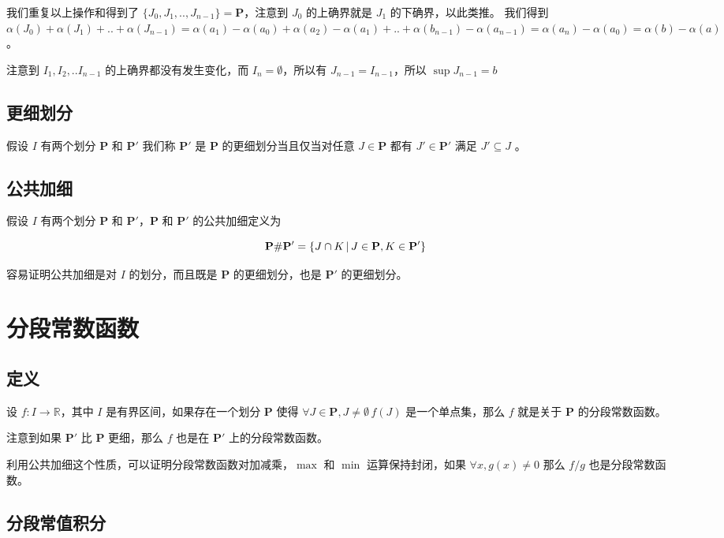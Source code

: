 我们重复以上操作和得到了 $\{ J_0, J_1, .., J_{n-1} \} = \mathbf{P}$，注意到 $J_0$ 的上确界就是 $J_1$ 的下确界，以此类推。
我们得到 $\alpha(J_0) + \alpha( J_1) + .. + \alpha( J_{n-1})  = \alpha(a_1) - \alpha(a_0) + \alpha(a_2) - \alpha(a_1) + .. + \alpha(b_{n-1}) - \alpha(a_{n-1}) = \alpha(a_n) - \alpha(a_0) = \alpha(b) - \alpha(a)$。

注意到 $I_1, I_2, .. I_{n-1}$ 的上确界都没有发生变化，而 $I_n = \emptyset$，所以有 $J_{n-1} = I_{n-1}$，所以 $\sup J_{n-1} = b$

\subsection{更细划分}

假设 $I $ 有两个划分 $\mathbf{P}$ 和 $\mathbf{P'}$ 我们称 $\mathbf{P'}$ 是 $\mathbf{P}$ 的更细划分当且仅当对任意 $J \in \mathbf{P}$ 都有 $J' \in \mathbf{P'}$ 满足 $J' \subseteq J$ 。

\subsection{公共加细}

假设 $I $ 有两个划分 $\mathbf{P}$ 和 $\mathbf{P'}$，$\mathbf{P}$ 和 $\mathbf{P'}$ 的公共加细定义为 

\[
    \mathbf{P} \# \mathbf{P'} = \{ J \cap K \,\vert\, J \in \mathbf{P}, K \in \mathbf{P'}\}
\]

容易证明公共加细是对 $I$ 的划分，而且既是 $ \mathbf{P}$ 的更细划分，也是 $\mathbf{P'}$ 的更细划分。

\section{分段常数函数}

\subsection{定义}
设 $f: I \to \mathbb{R}$，其中 $I$ 是有界区间，如果存在一个划分 $\mathbf{P}$ 使得 $\forall J \in \mathbf{P}, J \ne \emptyset \, f(J)$ 是一个单点集，那么 $f$ 就是关于 $\mathbf{P}$ 的分段常数函数。

注意到如果 $\mathbf{P'}$ 比 $\mathbf{P}$ 更细，那么 $f$ 也是在 $\mathbf{P'}$ 上的分段常数函数。

利用公共加细这个性质，可以证明分段常数函数对加减乘，$\max$ 和 $\min$ 运算保持封闭，如果 $\forall x, g(x) \ne 0$ 那么 $f/g$ 也是分段常数函数。

\subsection{分段常值积分}


